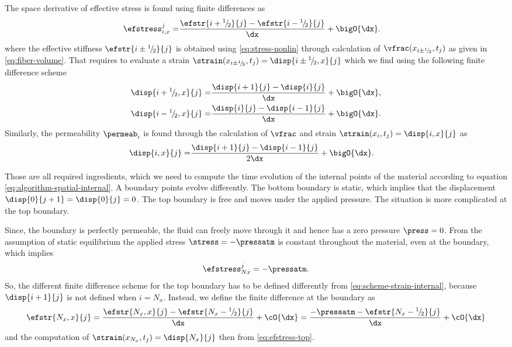\documentclass[twoside,a4paper,12pt]{article}
\newcommand*\rfrac[2]{{}^{#1}\!/\!_{#2}}
\begin{document}
The space derivative of effective stress is found using finite
differences as
%
\begin{align}
  \label{eq:fin-diff-efstress}
  \efstress_{i,x}^j  =& \frac{\efstr{i+\rfrac{1}{2}}{j} - \efstr{i-\rfrac{1}{2}}{j}}{\dx} + \bigO{\dx}.
\end{align}
%
where the effective stiffness $\efstr{i\pm\rfrac{1}{2}}{j}$ is
obtained using \eqref{eq:stress-nonlin} through calculation of
$\vfrac(x_{i\pm\rfrac{1}{2}},t_j)$ as given in
\eqref{eq:fiber-volume}.  That requires to evaluate a strain
$\strain(x_{i\pm\rfrac{1}{2}},t_j) = \disp{i\pm\rfrac{1}{2},x}{j}$
which we find using the following finite difference scheme
%
\begin{subequations}
  \begin{align}
  \disp{i+\rfrac{1}{2},x}{j} =& \frac{\disp{i+1}{j} - \disp{i}{j}}{\dx} + \bigO{\dx},\label{eq:scheme-strain-internal}\\
  \disp{i-\rfrac{1}{2},x}{j} =& \frac{\disp{i}{j} - \disp{i-1}{j}}{\dx} + \bigO{\dx}.
\end{align}
\end{subequations}
%
Similarly, the permeability $\permeab_i$ is found through the
calculation of $\vfrac$ and strain
$\strain(x_{i},t_j) = \disp{i,x}{j}$ as
\begin{align}
      \disp{i,x}{j} =& \frac{\disp{i+1}{j} - \disp{i-1}{j}}{2\dx} + \bigO{\dx}.
\end{align}


Those are all required ingredients, which we need to compute the time
evolution of the internal points of the material according to equation
\eqref{eq:algorithm-spatial-internal}. A boundary points evolve
differently. The bottom boundary is static, which implies that the
displacement $\disp{0}{j+1} = \disp{0}{j} = 0$. The top boundary is
free and moves under the applied pressure. The situation is more
complicated at the top boundary.


Since, the boundary is perfectly permeable, the fluid can freely move
through it and hence has a zero pressure $\press = 0$. From the
assumption of static equilibrium the applied stress
$\stress = -\pressatm$ is constant throughout the material, even at
the boundary, which implies
%
\begin{align}
  \efstress_{Nx}^{j} = -\pressatm. \label{eq:efstress-top}
\end{align}
%
So, the different finite difference scheme for the top boundary has to
be defined differently from \eqref{eq:scheme-strain-internal}, because
$\disp{i+1}{j}$ is not defined when $i=N_x$. Instead, we define the
finite difference at the boundary as
%
\begin{align}
\efstr{N_x,x}{j} = \frac{\efstr{N_x,x}{j} -\efstr{N_x-\rfrac{1}{2}}{j}}{\dx} + \cO{\dx} =  \frac{-\pressatm -\efstr{N_x-\rfrac{1}{2}}{j}}{\dx} + \cO{\dx}
\end{align}
%
and the computation of $\strain(x_{N_x},t_j) = \disp{N_x}{j}$ then
from \eqref{eq:efstress-top}.
\end{document}
